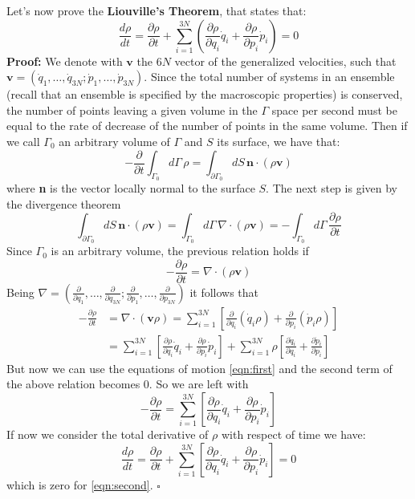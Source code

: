 Let's now prove the \textbf{Liouville's Theorem}, that states that:
\begin{equation}
\frac{d\rho}{dt} = \frac{\partial\rho}{\partial t}+\sum_{i=1}^{3N}\left(\frac{\partial\rho}{\partial q_i}\dot{q}_i+\frac{\partial\rho}{\partial p_i}\dot{p}_i\right)=0
\end{equation}
\textbf{Proof:} We denote with $\textbf{v}$ the $6N$ vector of the generalized velocities, such that $\textbf{v} = (\dot{q}_1,\dots,\dot{q}_{3N};\dot{p}_1,\dots,\dot{p}_{3N})$. Since the total number of systems in an ensemble (recall that an ensemble is specified by the macroscopic properties) is conserved, the number of points leaving a given volume in the $\Gamma$ space per second must be equal to the rate of decrease of the number of points in the same volume. Then if we call $\Gamma_0$ an arbitrary volume of $\Gamma$ and $S$ its surface, we have that:
\begin{equation}
-\frac{\partial}{\partial t}\int_{\Gamma_0}d\Gamma\,\rho = \int_{\partial\Gamma_0}dS\, \textbf{n}\cdot(\rho\textbf{v})
\end{equation}
where \textbf{n} is the vector locally normal to the surface $S$. The next step is given by the divergence theorem
\begin{equation}
\int_{\partial\Gamma_0}dS\, \textbf{n}\cdot(\rho\textbf{v}) = \int_{\Gamma_0} d\Gamma\,\nabla\cdot(\rho\textbf{v})=-\int_{\Gamma_0}d\Gamma\,\frac{\partial\rho}{\partial t}
\end{equation}
Since $\Gamma_0$ is an arbitrary volume, the previous relation holds if
\begin{equation}
-\frac{\partial\rho}{\partial t} = \nabla\cdot(\rho\textbf{v})
\end{equation}
Being $\nabla = \left(\frac{\partial}{\partial q_1},\dots,\frac{\partial}{\partial q_{3N}};\frac{\partial}{\partial p_{1}},\dots,\frac{\partial}{\partial p_{3N}}\right)$ it follows that
\begin{align}
-\frac{\partial\rho}{\partial t}&=\nabla\cdot(\textbf{v}\rho)=\sum_{i=1}^{3N}\left[\frac{\partial}{\partial q_i}(\dot{q}_i\rho)+\frac{\partial}{\partial p_i}(\dot{p}_i\rho)\right]\\
&=\sum_{i=1}^{3N}\left[\frac{\partial\rho}{\partial q_i}\dot{q}_i+\frac{\partial\rho}{\partial p_i}\dot{p}_i\right]+\sum_{i=1}^{3N}\rho\left[\frac{\partial\dot{q}_i}{\partial q_i}+\frac{\partial\dot{p}_i}{\partial p_i}\right]
\end{align}
But now we can use the equations of motion \ref{eqn:first} and the second term of the above relation becomes $0$. So we are left with
\begin{equation}
\label{eqn:second}
-\frac{\partial\rho}{\partial t} = \sum_{i=1}^{3N}\left[\frac{\partial\rho}{\partial q_i}\dot{q}_i+\frac{\partial\rho}{\partial p_i}\dot{p}_i\right]
\end{equation}
If now we consider the total derivative of $\rho$ with respect of time we have:
\begin{equation}
\frac{d\rho}{dt} = \frac{\partial\rho}{\partial t} + \sum_{i=1}^{3N}\left[\frac{\partial\rho}{\partial q_i}\dot{q}_i+\frac{\partial\rho}{\partial p_i}\dot{p}_i\right] = 0
\end{equation}
which is zero for \ref{eqn:second}.
$\square$


